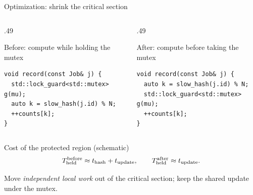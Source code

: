 \documentclass[handout,aspectratio=169,11pt]{beamer}
\newcommand{\Takeaway}[1]{\begin{exampleblock}{}#1\end{exampleblock}}
\begin{document}
\begin{frame}[fragile]{Optimization: shrink the critical section}
  \small
  \begin{columns}[T,onlytextwidth]
    \begin{column}{.49\textwidth}
      \begin{alertblock}{Before: compute while holding the mutex}
        \vspace{1mm}
        \scriptsize
\begin{verbatim}
void record(const Job& j) {
  std::lock_guard<std::mutex> g(mu);
  auto k = slow_hash(j.id) % N;
  ++counts[k];
}
\end{verbatim}
        \vspace{-1mm}
      \end{alertblock}
    \end{column}
    \begin{column}{.49\textwidth}
      \begin{exampleblock}{After: compute before taking the mutex}
        \vspace{1mm}
        \scriptsize
\begin{verbatim}
void record(const Job& j) {
  auto k = slow_hash(j.id) % N;
  std::lock_guard<std::mutex> g(mu);
  ++counts[k];
}
\end{verbatim}
        \vspace{-1mm}
      \end{exampleblock}
    \end{column}
  \end{columns}
  \vspace{1mm}
  \begin{block}{Cost of the protected region (schematic)}
    \[
      T_{\rm held}^{\rm before}\approx t_{\rm hash}+t_{\rm update},
      \qquad
      T_{\rm held}^{\rm after}\approx t_{\rm update}.
    \]
  \end{block}
  \Takeaway{Move \emph{independent local work} out of the critical section;
    keep the shared update under the mutex.}
\end{frame}
\end{document}
